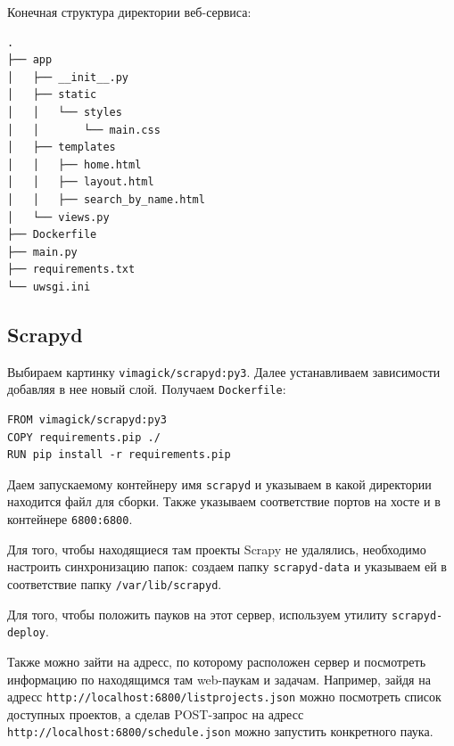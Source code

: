 Конечная структура директории веб-сервиса:
\begin{verbatim}
.
├── app
│   ├── __init__.py
│   ├── static
│   │   └── styles
│   │       └── main.css
│   ├── templates
│   │   ├── home.html
│   │   ├── layout.html
│   │   ├── search_by_name.html
│   └── views.py
├── Dockerfile
├── main.py
├── requirements.txt
└── uwsgi.ini
\end{verbatim}


\subsection{Scrapyd}
Выбираем картинку \verb|vimagick/scrapyd:py3|. Далее устанавливаем зависимости
добавляя в нее новый слой. Получаем \verb|Dockerfile|:
\begin{verbatim}
FROM vimagick/scrapyd:py3
COPY requirements.pip ./
RUN pip install -r requirements.pip
\end{verbatim}

Даем запускаемому контейнеру имя \verb|scrapyd| и указываем в какой директории
находится файл для сборки. Также указываем соответствие портов на хосте и в
контейнере \verb|6800:6800|.

Для того, чтобы находящиеся там проекты Scrapy не удалялись, необходимо
настроить синхронизацию папок: создаем папку \verb|scrapyd-data| и указываем ей
в соответствие папку \verb|/var/lib/scrapyd|.

Для того, чтобы положить пауков на этот сервер, используем утилиту
\verb|scrapyd-deploy|.

Также можно зайти на адресс, по которому расположен сервер и посмотреть
информацию по находящимся там web-паукам и задачам. Например, зайдя на адресс
\verb|http://localhost:6800/listprojects.json| можно посмотреть список доступных
проектов, а сделав POST-запрос на адресс
\verb|http://localhost:6800/schedule.json| можно запустить конкретного паука.

